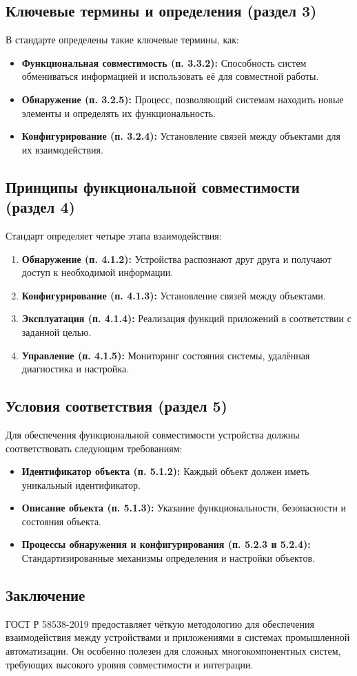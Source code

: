 \subsection*{Ключевые термины и определения (раздел 3)}
В стандарте определены такие ключевые термины, как:
\begin{itemize}
    \item \textbf{Функциональная совместимость (п. 3.3.2):} Способность систем обмениваться информацией и использовать её для совместной работы.
    \item \textbf{Обнаружение (п. 3.2.5):} Процесс, позволяющий системам находить новые элементы и определять их функциональность.
    \item \textbf{Конфигурирование (п. 3.2.4):} Установление связей между объектами для их взаимодействия.
\end{itemize}

\subsection*{Принципы функциональной совместимости (раздел 4)}
Стандарт определяет четыре этапа взаимодействия:
\begin{enumerate}
    \item \textbf{Обнаружение (п. 4.1.2):} Устройства распознают друг друга и получают доступ к необходимой информации.
    \item \textbf{Конфигурирование (п. 4.1.3):} Установление связей между объектами.
    \item \textbf{Эксплуатация (п. 4.1.4):} Реализация функций приложений в соответствии с заданной целью.
    \item \textbf{Управление (п. 4.1.5):} Мониторинг состояния системы, удалённая диагностика и настройка.
\end{enumerate}

\subsection*{Условия соответствия (раздел 5)}
Для обеспечения функциональной совместимости устройства должны соответствовать следующим требованиям:
\begin{itemize}
    \item \textbf{Идентификатор объекта (п. 5.1.2):} Каждый объект должен иметь уникальный идентификатор.
    \item \textbf{Описание объекта (п. 5.1.3):} Указание функциональности, безопасности и состояния объекта.
    \item \textbf{Процессы обнаружения и конфигурирования (п. 5.2.3 и 5.2.4):} Стандартизированные механизмы определения и настройки объектов.
\end{itemize}

\subsection*{Заключение}
ГОСТ Р 58538-2019 предоставляет чёткую методологию для обеспечения взаимодействия между устройствами и приложениями в системах промышленной автоматизации.
Он особенно полезен для сложных многокомпонентных систем, требующих высокого уровня совместимости и интеграции.
